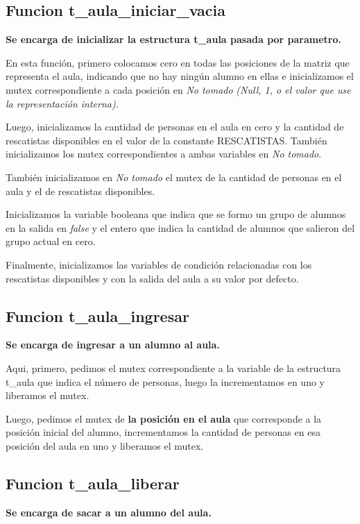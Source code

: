 \subsection{Funcion t\_aula\_iniciar\_vacia}

\textbf{Se encarga de inicializar la estructura t\_aula pasada por parametro.}

En esta función, primero colocamos cero en todas las posiciones de la matriz que representa el aula, indicando que no hay ningún alumno en ellas e inicializamos el mutex correspondiente a cada posición en \textit{No tomado} \textit{(Null, 1, o el valor que use la representación interna)}.

Luego, inicializamos la cantidad de personas en el aula en cero y la cantidad de rescatistas disponibles en el valor de la constante RESCATISTAS. También inicializamos los mutex correspondientes a ambas variables en \textit{No tomado}.

También inicializamos en \textit{No tomado} el mutex de la cantidad de personas en el aula y el de rescatistas disponibles.

Inicializamos la variable booleana que indica que se formo un grupo de alumnos en la salida en \textit{false} y el entero que indica la cantidad de alumnos que salieron del grupo actual en cero.

Finalmente, inicializamos las variables de condición relacionadas con los rescatistas disponibles y con la salida del aula a su valor por defecto.


\subsection{Funcion t\_aula\_ingresar}
\textbf{Se encarga de ingresar a un alumno al aula.}

Aqui, primero, pedimos el mutex correspondiente a la variable de la estructura t\_aula que indica el número de personas, luego la incrementamos en uno y liberamos el mutex.

Luego, pedimos el mutex de \textbf{la posición en el aula} que corresponde a la posición inicial del alumno, incrementamos la cantidad de personas en esa posición del aula en uno y liberamos el mutex.


\subsection{Funcion t\_aula\_liberar}
\textbf{Se encarga de sacar a un alumno del aula.}

